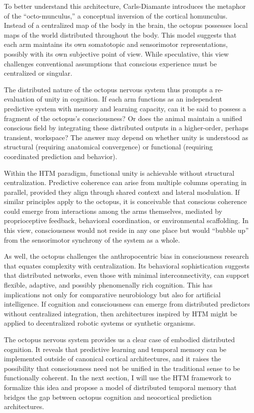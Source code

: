 \documentclass{article}
\begin{document}
To better understand this architecture, Carls-Diamante introduces the metaphor of the “octo-munculus,” a conceptual inversion of the cortical homunculus. Instead of a centralized map of the body in the brain, the octopus possesses local maps of the world distributed throughout the body. This model suggests that each arm maintains its own somatotopic and sensorimotor representations, possibly with its own subjective point of view. While speculative, this view challenges conventional assumptions that conscious experience must be centralized or singular.

The distributed nature of the octopus nervous system thus prompts a re-evaluation of unity in cognition. If each arm functions as an independent predictive system with memory and learning capacity, can it be said to possess a fragment of the octopus’s consciousness? Or does the animal maintain a unified conscious field by integrating these distributed outputs in a higher-order, perhaps transient, workspace? The answer may depend on whether unity is understood as structural (requiring anatomical convergence) or functional (requiring coordinated prediction and behavior).

Within the HTM paradigm, functional unity is achievable without structural centralization. Predictive coherence can arise from multiple columns operating in parallel, provided they align through shared context and lateral modulation. If similar principles apply to the octopus, it is conceivable that conscious coherence could emerge from interactions among the arms themselves, mediated by proprioceptive feedback, behavioral coordination, or environmental scaffolding. In this view, consciousness would not reside in any one place but would “bubble up” from the sensorimotor synchrony of the system as a whole.

As well, the octopus challenges the anthropocentric bias in consciousness research that equates complexity with centralization. Its behavioral sophistication suggests that distributed networks, even those with minimal interconnectivity, can support flexible, adaptive, and possibly phenomenally rich cognition. This has implications not only for comparative neurobiology but also for artificial intelligence. If cognition and consciousness can emerge from distributed predictors without centralized integration, then architectures inspired by HTM might be applied to decentralized robotic systems or synthetic organisms.

The octopus nervous system provides us a clear case of embodied distributed cognition. It reveals that predictive learning and temporal memory can be implemented outside of canonical cortical architectures, and it raises the possibility that consciousness need not be unified in the traditional sense to be functionally coherent. In the next section, I will use the HTM framework to formalize this idea and propose a model of distributed temporal memory that bridges the gap between octopus cognition and neocortical prediction architectures.
\end{document}
